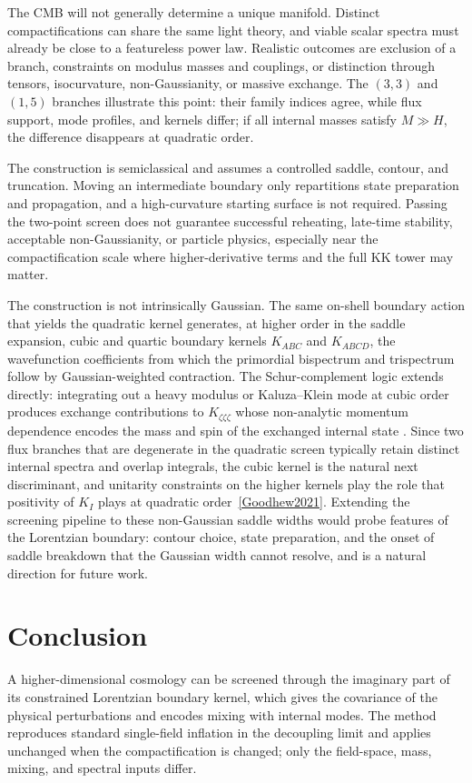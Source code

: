 \documentclass[11pt,a4paper]{article}
\begin{document}
The CMB will not generally determine a unique manifold. Distinct compactifications can share the same light theory, and viable scalar spectra must already be close to a featureless power law. Realistic outcomes are exclusion of a branch, constraints on modulus masses and couplings, or distinction through tensors, isocurvature, non-Gaussianity, or massive exchange. The $(3,3)$ and $(1,5)$ branches illustrate this point: their family indices agree, while flux support, mode profiles, and kernels differ; if all internal masses satisfy $M\gg H$, the difference disappears at quadratic order.

The construction is semiclassical and assumes a controlled saddle, contour, and truncation. Moving an intermediate boundary only repartitions state preparation and propagation, and a high-curvature starting surface is not required. Passing the two-point screen does not guarantee successful reheating, late-time stability, acceptable non-Gaussianity, or particle physics, especially near the compactification scale where higher-derivative terms and the full KK tower may matter.

The construction is not intrinsically Gaussian. The same on-shell boundary
action that yields the quadratic kernel generates, at higher order in the
saddle expansion, cubic and quartic boundary kernels
$K_{ABC}$ and $K_{ABCD}$, the wavefunction coefficients from which the
primordial bispectrum and trispectrum follow by Gaussian-weighted
contraction. The Schur-complement logic extends directly: integrating out a
heavy modulus or Kaluza--Klein mode at cubic order produces exchange
contributions to $K_{\zeta\zeta\zeta}$ whose non-analytic momentum
dependence encodes the mass and spin of the exchanged internal state
\cite{ArkaniHamedMaldacena2015}. Since two flux branches that are degenerate
in the quadratic screen typically retain distinct internal spectra and
overlap integrals, the cubic kernel is the natural next discriminant, and
unitarity constraints on the higher kernels play the role that positivity of
$K_I$ plays at quadratic order~\ref{Goodhew2021}. Extending the screening pipeline to these
non-Gaussian saddle widths would probe features of the Lorentzian boundary:
contour choice, state preparation, and the onset of saddle breakdown
that the Gaussian width cannot resolve, and is a natural direction for
future work.

\section{Conclusion}
A higher-dimensional cosmology can be screened through the imaginary part of its constrained Lorentzian boundary kernel, which gives the covariance of the physical perturbations and encodes mixing with internal modes. The method reproduces standard single-field inflation in the decoupling limit and applies unchanged when the compactification is changed; only the field-space, mass, mixing, and spectral inputs differ.
\end{document}
